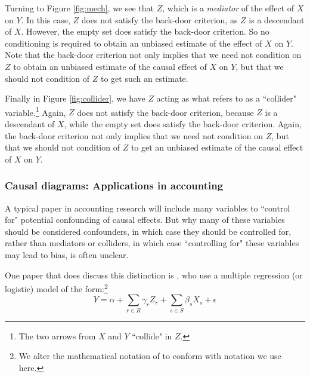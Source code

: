 \documentclass[11pt,reqno,titlepage]{amsart}
\begin{document}
\begin{doublespace}
Turning to Figure \ref{fig:mech}, we see that $Z$, which is a \emph{mediator} of the effect of $X$ on $Y$.
In this case, $Z$ does not satisfy the back-door criterion, as $Z$ is a descendant of $X$.
However,  the empty set does satisfy the back-door criterion.
So no conditioning is required to obtain an unbiased estimate of the effect of $X$ on $Y$.
Note that the back-door criterion not only implies that we need not condition on $Z$ to obtain an unbiased estimate of the causal effect of $X$ on $Y$, but that we should not condition of $Z$ to get such an estimate.

Finally in Figure \ref{fig:collider}, we have $Z$ acting as what \citet[p.\,17]{Pearl:2009kh} refers to as a ``collider" variable.\footnote{
The two arrows from $X$ and $Y$ ``collide" in $Z$.} 
Again, $Z$ does not satisfy the back-door criterion, because $Z$ is a descendant of $X$, while the empty set does satisfy the back-door criterion.
Again, the back-door criterion not only implies that we need not condition on $Z$, but that we should not condition of $Z$ to get an unbiased estimate of the causal effect of $X$ on $Y$.

\subsubsection{Causal diagrams: Applications in accounting}
A typical paper in accounting research will include many variables  to ``control for" potential confounding of causal effects.
But why many of these variables should be considered confounders, in which case they should be controlled for, rather than mediators or colliders, in which case ``controlling for" these variables may lead to bias, is often unclear.

One paper that does discuss this distinction is \citet{Larcker:2007aa}, who use a multiple regression (or logistic) model of the form:\footnote{We alter the mathematical notation of  \citet{Larcker:2007aa} to conform with notation we use here.}
\begin{equation}
Y = \alpha + \sum_{r \in R} \gamma _r Z_r + \sum_{s \in S} \beta_s X_s + \epsilon \label{eqn:lrt1}
\end{equation}


\end{doublespace}
\end{document}
